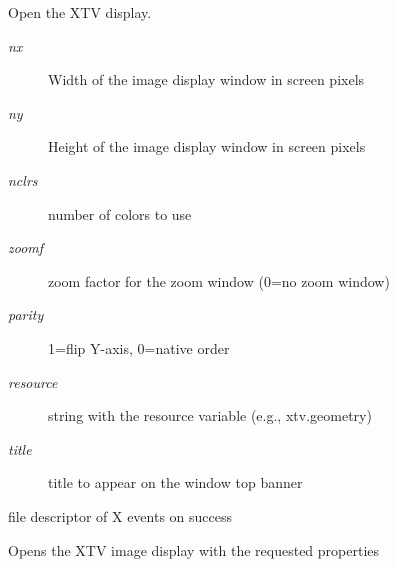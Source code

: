 Open the XTV display. 

\begin{Desc}
\item[Parameters:]
\begin{description}
\item[{\em nx}]Width of the image display window in screen pixels \item[{\em ny}]Height of the image display window in screen pixels \item[{\em nclrs}]number of colors to use \item[{\em zoomf}]zoom factor for the zoom window (0=no zoom window) \item[{\em parity}]1=flip Y-axis, 0=native order \item[{\em resource}]string with the resource variable (e.g., xtv.geometry) \item[{\em title}]title to appear on the window top banner\end{description}
\end{Desc}
\begin{Desc}
\item[Returns:]file descriptor of X events on success\end{Desc}
Opens the XTV image display with the requested properties 